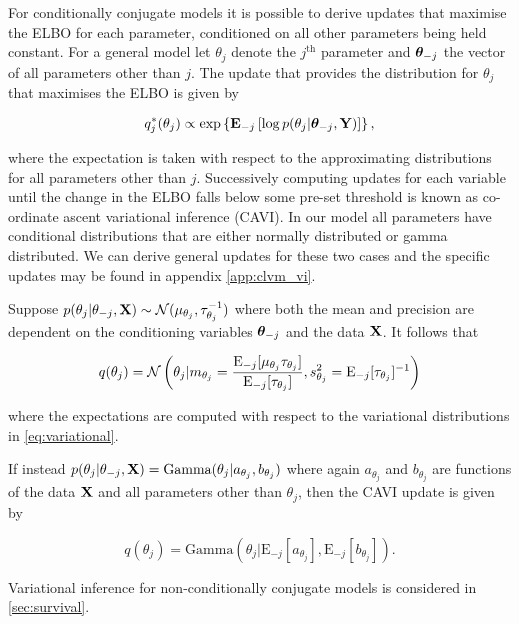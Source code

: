 For conditionally conjugate models it is possible to derive updates that maximise the ELBO for each parameter, conditioned on all other parameters being held constant. For a general model let $\theta_j$ denote the $j^{\text{th}}$ parameter and  $\bm{\theta}_{-j}$ the vector of all parameters other than $j$. The update that provides the distribution for $\theta_j$ that maximises the ELBO is given by

\begin{equation}
q^*_j(\theta_j) \propto \exp \left\{  \mathbf{E}_{-j} \left[ \log p(\theta_j | \bm{\theta}_{-j}, \mathbf{Y}) \right]
 \right\},
\end{equation}

where the expectation is taken with respect to the approximating distributions for all parameters other than $j$. Successively computing updates for each variable until the change in the ELBO falls below some pre-set threshold is known as co-ordinate ascent variational inference (CAVI). In our model all parameters have conditional distributions that are either normally distributed or gamma distributed. We can derive general updates for these two cases and the specific updates may be found in appendix \ref{app:clvm_vi}.

Suppose $p(\theta_j | \theta_{-j}, \mathbf{X}) \sim \mathcal{N}(\mu_{\theta_j}, \tau_{\theta_j}^{-1})$ where both the mean and precision  are dependent on the conditioning variables $\bm{\theta}_{-j}$ and the data $\mathbf{X}$. It follows that

\begin{equation}
q(\theta_j) = \mathcal{N}\left(
\theta_j |
m_{\theta_j} = \frac{\text{E}_{-j}[\mu_{\theta_j} \tau_{\theta_j}]}{\text{E}_{-j}[\tau_{\theta_j}]},
s_{\theta_j}^2 = \text{E}_{-j}[\tau_{\theta_j}]^{-1}
\right)
\end{equation}

where the expectations are computed with respect to the variational distributions in \ref{eq:variational}.

If instead $p(\theta_j | \theta_{-j}, \mathbf{X}) = \text{Gamma}(\theta_j | a_{\theta_j}, b_{\theta_j})$ where again $a_{\theta_j}$ and $b_{\theta_j}$ are functions of the data $\mathbf{X}$ and all parameters other than $\theta_j$, then the CAVI update 	is given by

\begin{equation}
q(\theta_j) = \text{Gamma}\left(
\theta_j |
\text{E}_{-j}[a_{\theta_j}], \text{E}_{-j}[b_{\theta_j}]
\right).
\end{equation}


Variational inference for non-conditionally conjugate models is considered in \ref{sec:survival}.


